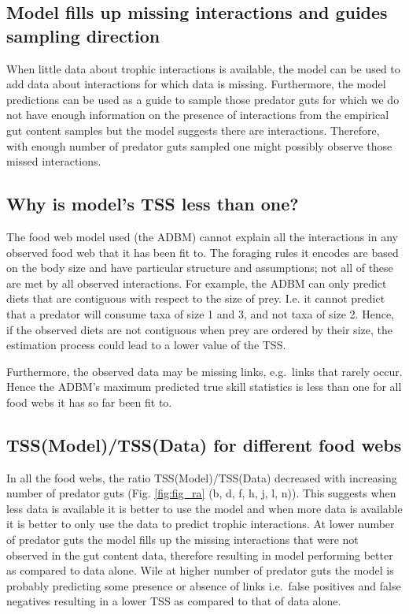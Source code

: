 \documentclass{article}
\begin{document}
\hypertarget{model-fills-up-missing-interactions-and-guides-sampling-direction}{%
\subsection{Model fills up missing interactions and guides sampling
direction}\label{model-fills-up-missing-interactions-and-guides-sampling-direction}}

When little data about trophic interactions is available, the model can
be used to add data about interactions for which data is missing.
Furthermore, the model predictions can be used as a guide to sample
those predator guts for which we do not have enough information on the
presence of interactions from the empirical gut content samples but the
model suggests there are interactions. Therefore, with enough number of
predator guts sampled one might possibly observe those missed
interactions.

\hypertarget{why-is-models-tss-less-than-one}{%
\subsection{Why is model's TSS less than
one?}\label{why-is-models-tss-less-than-one}}

The food web model used (the ADBM) cannot explain all the interactions
in any observed food web that it has been fit to. The foraging rules it
encodes are based on the body size and have particular structure and
assumptions; not all of these are met by all observed interactions. For
example, the ADBM can only predict diets that are contiguous with
respect to the size of prey. I.e. it cannot predict that a predator will
consume taxa of size 1 and 3, and not taxa of size 2. Hence, if the
observed diets are not contiguous when prey are ordered by their size,
the estimation process could lead to a lower value of the TSS.

Furthermore, the observed data may be missing links, e.g.~links that
rarely occur. Hence the ADBM's maximum predicted true skill statistics
is less than one for all food webs it has so far been fit to.

\hypertarget{tssmodeltssdata-for-different-food-webs}{%
\subsection{TSS(Model)/TSS(Data) for different food
webs}\label{tssmodeltssdata-for-different-food-webs}}

In all the food webs, the ratio TSS(Model)/TSS(Data) decreased with
increasing number of predator guts (Fig. \ref{fig:fig_ra} (b, d, f, h,
j, l, n)). This suggests when less data is available it is better to use
the model and when more data is available it is better to only use the
data to predict trophic interactions. At lower number of predator guts
the model fills up the missing interactions that were not observed in
the gut content data, therefore resulting in model performing better as
compared to data alone. Wile at higher number of predator guts the model
is probably predicting some presence or absence of links i.e.~false
positives and false negatives resulting in a lower TSS as compared to
that of data alone.
\end{document}

